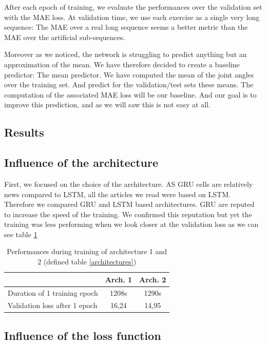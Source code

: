 \documentclass[final]{cvpr}
\begin{document}
After each epoch of training, we evaluate the performances over the validation set with the MAE loss. At validation time, we use each exercise as a single very long sequence: The MAE over a real long sequence seems a better metric than the MAE over the artificial sub-sequences.

Moreover as we noticed, the network is struggling to predict anything but an approximation of the mean. We have therefore decided to create a baseline predictor: The mean predictor. We have computed the mean of the joint angles over the training set. And predict for the validation/test sets these means. The computation of the associated MAE loss will be our baseline. And our goal is to improve this prediction, and as we will saw this is not easy at all.


\subsection{Results}
\subsection*{Influence of the architecture}
First, we focused on the choice of the architecture. AS GRU cells are relatively news compared to LSTM, all the articles \cite{Koch, Quivira, Kir}  we read were based on LSTM. Therefore we compared GRU and LSTM based architectures. GRU are reputed to increase the speed of the training. We confirmed this reputation but yet the training was less performing when we look closer at the validation loss as we can see table  \ref{GRUvsLSTM}


\begin{table}
	\begin{center}
		\begin{tabular}{l c c }
			\toprule
			& Arch. 1 & Arch. 2 \\
			\hline
			Duration of 1 training epoch & 1208s & 1290s   \\
			Validation loss after 1 epoch & 16,24 & 14,95 \\
			\toprule
		\end{tabular}
	\end{center}
	\caption{Performances during training of architecture 1 and 2 (defined table \ref{architectures})}
	\label{GRUvsLSTM}
\end{table}

\subsection*{Influence of the loss function}
\end{document}
